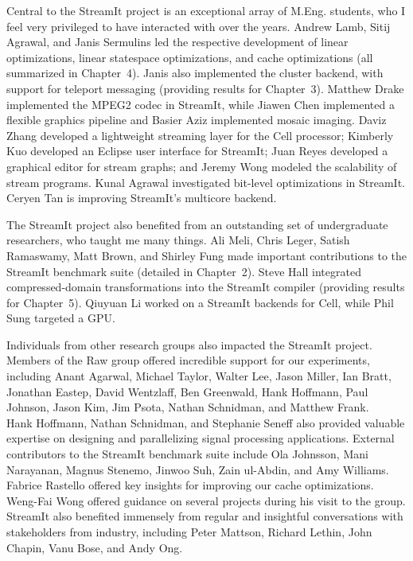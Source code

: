 Central to the StreamIt project is an exceptional array of
M.Eng. students, who I feel very privileged to have interacted with
over the years.  Andrew Lamb, Sitij Agrawal, and Janis Sermulins led
the respective development of linear optimizations, linear statespace
optimizations, and cache optimizations (all summarized in Chapter~4).
Janis also implemented the cluster backend, with support for teleport
messaging (providing results for Chapter~3).  Matthew Drake
implemented the MPEG2 codec in StreamIt, while Jiawen Chen implemented
a flexible graphics pipeline and Basier Aziz implemented mosaic
imaging.  Daviz Zhang developed a lightweight streaming layer for the
Cell processor; Kimberly Kuo developed an Eclipse user interface for
StreamIt; Juan Reyes developed a graphical editor for stream graphs;
and Jeremy Wong modeled the scalability of stream programs.  Kunal
Agrawal investigated bit-level optimizations in StreamIt.  Ceryen Tan
is improving StreamIt's multicore backend.

The StreamIt project also benefited from an outstanding set of
undergraduate researchers, who taught me many things.  Ali Meli, Chris
Leger, Satish Ramaswamy, Matt Brown, and Shirley Fung made important
contributions to the StreamIt benchmark suite (detailed in Chapter~2).
Steve Hall integrated compressed-domain transformations into the
StreamIt compiler (providing results for Chapter~5).  Qiuyuan Li
worked on a StreamIt backends for Cell, while Phil Sung targeted a
GPU.


Individuals from other research groups also impacted the StreamIt
project.  Members of the Raw group offered incredible support for our
experiments, including Anant Agarwal, Michael Taylor, Walter Lee,
Jason Miller, Ian Bratt, Jonathan Eastep, David Wentzlaff, Ben
Greenwald, Hank Hoffmann, Paul Johnson, Jason Kim, Jim Psota, Nathan
Schnidman, and Matthew Frank.
%
\newpage
\enlargethispage{0.3\baselineskip}
%
~ \vspace{-1.3\baselineskip}\\
\noindent Hank Hoffmann, Nathan Schnidman, and Stephanie Seneff also
provided valuable expertise on designing and parallelizing signal
processing applications.  External contributors to the StreamIt
benchmark suite include Ola Johnsson, Mani Narayanan, Magnus
Stenemo, Jinwoo Suh, Zain ul-Abdin, and Amy Williams.  Fabrice
Rastello offered key insights for improving our cache optimizations.
Weng-Fai Wong offered guidance on several projects during his visit
to the group.  StreamIt also benefited immensely from regular and
insightful conversations with stakeholders from industry, including
Peter Mattson, Richard Lethin, John Chapin, Vanu Bose, and Andy Ong.

